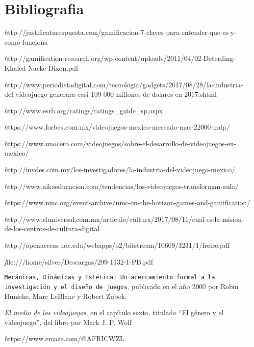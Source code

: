 \chapter{Bibliografia}	

\begin{thebibliography}{X}
	\textit http://justificaturespuesta.com/gamificacion-7-claves-para-entender-que-es-y-como-funciona
	
	\textit http://gamification-research.org/wp-content/uploads/2011/04/02-Deterding-Khaled-Nacke-Dixon.pdf

	\textit http://www.periodistadigital.com/tecnologia/gadgets/2017/08/28/la-industria-del-videojuego-generara-casi-109-000-millones-de-dolares-en-2017.shtml
	
	\textit http://www.esrb.org/ratings/ratings\_guide\_sp.aspx
		
	\textit https://www.forbes.com.mx/videojuegos-mexico-mercado-mas-22000-mdp/
	
	\textit https://www.unocero.com/videojuegos/sobre-el-desarrollo-de-videojuegos-en-mexico/
	
	\textit http://invdes.com.mx/los-investigadores/la-industria-del-videojuego-mexico/
	
	\textit http://www.aikaeducacion.com/tendencias/los-videojuegos-transforman-aula/
	
	\textit https://www.nmc.org/event-archive/nmc-on-the-horizon-games-and-gamification/
	
	\textit http://www.eluniversal.com.mx/articulo/cultura/2017/08/11/cual-es-la-mision-de-los-centros-de-cultura-digital
	
	\textit http://openaccess.uoc.edu/webapps/o2/bitstream/10609/3231/1/freire.pdf
	
	\textit file:///home/silver/Descargas/299-1132-1-PB.pdf
	
	\texttt {Mecánicas, Dinámicas y Estética: Un acercamiento formal a la investigación y el diseño de juegos}, publicado en el año 2000 por Robin Hunicke, Marc LeBlanc y Robert Zubek.

	\textit{El medio de los videojuegos}, en el capítulo sexto, titulado “El género y el videojuego”, del libro por Mark J. P. Wolf
	
	\textit https://www.emaze.com/@AFRICWZL
\end{thebibliography}
